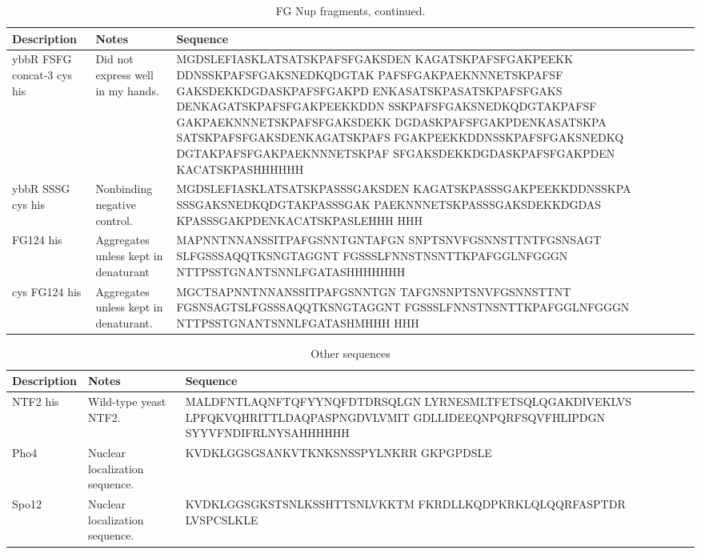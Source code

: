 \begin{table}[b!]
\centering
  \caption{FG Nup fragments, continued.}
    \label{table:FSFG}
    \begin{tabular}{p{3.5cm}p{4cm}p{8cm}}
      Description & Notes &Sequence \\
      \hline
	ybbR FSFG concat-3 cys his& Did not express well in my hands.& MGDSLEFIASKLATSATSKPAFSFGAKSDEN
KAGATSKPAFSFGAKPEEKK
DDNSSKPAFSFGAKSNEDKQDGTAK
PAFSFGAKPAEKNNNETSKPAFSF
GAKSDEKKDGDASKPAFSFGAKPD
ENKASATSKPASATSKPAFSFGAKS
DENKAGATSKPAFSFGAKPEEKKDDN
SSKPAFSFGAKSNEDKQDGTAKPAFSF
GAKPAEKNNNETSKPAFSFGAKSDEKK
DGDASKPAFSFGAKPDENKASATSKPA
SATSKPAFSFGAKSDENKAGATSKPAFS
FGAKPEEKKDDNSSKPAFSFGAKSNEDKQ
DGTAKPAFSFGAKPAEKNNNETSKPAF
SFGAKSDEKKDGDASKPAFSFGAKPDEN
KACATSKPASHHHHHH\\
\hline
ybbR SSSG cys his & Nonbinding negative control. & MGDSLEFIASKLATSATSKPASSSGAKSDEN
KAGATSKPASSSGAKPEEKKDDNSSKPA
SSSGAKSNEDKQDGTAKPASSSGAK
PAEKNNNETSKPASSSGAKSDEKKDGDAS
KPASSSGAKPDENKACATSKPASLEHHH
HHH\\
	\hline

	FG124 his& Aggregates unless kept in denaturant & MAPNNTNNANSSITPAFGSNNTGNTAFGN
SNPTSNVFGSNNSTTNTFGSNSAGT
SLFGSSSAQQTKSNGTAGGNT
FGSSSLFNNSTNSNTTKPAFGGLNFGGGN
NTTPSSTGNANTSNNLFGATASHHHHHHH\\
\hline
	cys FG124 his& Aggregates unless kept in denaturant. & MGCTSAPNNTNNANSSITPAFGSNNTGN
TAFGNSNPTSNVFGSNNSTTNT
FGSNSAGTSLFGSSSAQQTKSNGTAGGNT
FGSSSLFNNSTNSNTTKPAFGGLNFGGGN
NTTPSSTGNANTSNNLFGATASHMHHH
HHH\\
\hline
    \end{tabular}
\end{table}
\newpage
\begin{table}[b!]
\centering
  \caption{Other sequences}
    \label{table:sequences}
    \begin{tabular}{p{3.5cm}p{4cm}p{8cm}}
      Description & Notes &Sequence \\


\hline
	
NTF2 his & Wild-type yeast NTF2. & MALDFNTLAQNFTQFYYNQFDTDRSQLGN
LYRNESMLTFETSQLQGAKDIVEKLVS
LPFQKVQHRITTLDAQPASPNGDVLVMIT
GDLLIDEEQNPQRFSQVFHLIPDGN
SYYVFNDIFRLNYSAHHHHHH\\
	\hline
Pho4 & Nuclear localization sequence. & KVDKLGGSGSANKVTKNKSNSSPYLNKRR
GKPGPDSLE \\
\hline
Spo12 & Nuclear localization sequence. & KVDKLGGSGKSTSNLKSSHTTSNLVKKTM
FKRDLLKQDPKRKLQLQQRFASPTDR
LVSPCSLKLE
 \\

\hline
    \end{tabular}
\end{table}